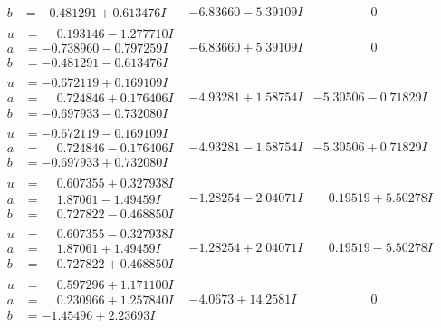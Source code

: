 \documentclass[1p]{elsarticle_modified}
\theoremstyle{definition}
\begin{document}
$$\begin{array}{c|c|c}
\begin{aligned}
b &= -0.481291 + 0.613476 I\end{aligned}
 & -6.83660 - 5.39109 I & \phantom{-0.000000 } 0 \\ \hline\begin{aligned}
u &= \phantom{-}0.193146 - 1.277710 I \\
a &= -0.738960 - 0.797259 I \\
b &= -0.481291 - 0.613476 I\end{aligned}
 & -6.83660 + 5.39109 I & \phantom{-0.000000 } 0 \\ \hline\begin{aligned}
u &= -0.672119 + 0.169109 I \\
a &= \phantom{-}0.724846 + 0.176406 I \\
b &= -0.697933 - 0.732080 I\end{aligned}
 & -4.93281 + 1.58754 I & -5.30506 - 0.71829 I \\ \hline\begin{aligned}
u &= -0.672119 - 0.169109 I \\
a &= \phantom{-}0.724846 - 0.176406 I \\
b &= -0.697933 + 0.732080 I\end{aligned}
 & -4.93281 - 1.58754 I & -5.30506 + 0.71829 I \\ \hline\begin{aligned}
u &= \phantom{-}0.607355 + 0.327938 I \\
a &= \phantom{-}1.87061 - 1.49459 I \\
b &= \phantom{-}0.727822 - 0.468850 I\end{aligned}
 & -1.28254 - 2.04071 I & \phantom{-}0.19519 + 5.50278 I \\ \hline\begin{aligned}
u &= \phantom{-}0.607355 - 0.327938 I \\
a &= \phantom{-}1.87061 + 1.49459 I \\
b &= \phantom{-}0.727822 + 0.468850 I\end{aligned}
 & -1.28254 + 2.04071 I & \phantom{-}0.19519 - 5.50278 I \\ \hline\begin{aligned}
u &= \phantom{-}0.597296 + 1.171100 I \\
a &= \phantom{-}0.230966 + 1.257840 I \\
b &= -1.45496 + 2.23693 I\end{aligned}
 & -4.0673 + 14.2581 I & \phantom{-0.000000 } 0 \\ \hline\begin{aligned}

\end{aligned}
\end{array}$$
\end{document}
